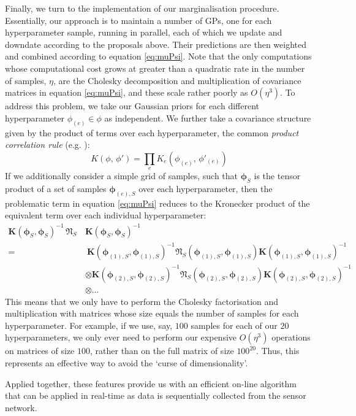 \documentclass{acmtrans2m}
\newcommand{\vect}[1]{\boldsymbol{#1}}
\newcommand{\vph}{\vect{\phi}}
\newcommand{\Nt}{\mat{\mathfrak{N}}_S}
\newcommand{\mat}[1]{\mathbf{#1}}
\begin{document}
Finally, we turn to the implementation of our marginalisation procedure. Essentially, our approach is to maintain a number of GPs, one for each hyperparameter sample, running in parallel, each of which we update and downdate according to the proposals above. Their predictions are then weighted and combined according to equation \eqref{eq:muPsi}. Note that the only computations whose computational cost grows at greater than a quadratic rate in the number of samples, $\eta$, are the Cholesky decomposition and multiplication of covariance matrices in equation \eqref{eq:muPsi}, and these scale rather poorly as $O(\eta^3)$. To address this problem, we take our Gaussian priors for each different hyperparameter $\phi_{(e)} \in \phi$ as independent. We further take a covariance structure given by the product of terms over each hyperparameter, the common \emph{product correlation rule} (e.g. ):
\begin{equation}
 K(\phi,\,\phi')=\prod_e K_e(\phi_{(e)},\,\phi'_{(e)})
\end{equation}
If we additionally consider a simple grid of samples, such that $\vph_{S}$ is the tensor product of a set of samples $\vph_{(e),S}$ over each hyperparameter, then the problematic term in equation \eqref{eq:muPsi} reduces to the Kronecker product of the equivalent term over each individual hyperparameter:
\begin{align}\label{eq:KNK}
\mat{K} \!(\vph_{S},\vph_S)^{-1}\,\Nt\,&\mat{K}\!(\vph_S,\vph_S)^{-1}\nonumber\\
 = & ~\mat{K}\!(\vph_{(1),S},\vph_{(1),S})^{-1}\Nt\!(\vph_{(1),S},\vph_{(1),S})\mat{K}\!(\vph_{(1),S},\vph_{(1),S})^{-1}\nonumber\\ & \otimes \mat{K}\!(\vph_{(2),S},\vph_{(2),S})^{-1}\Nt\!(\vph_{(2),S},\vph_{(2),S})\mat{K}\!(\vph_{(2),S},\vph_{(2),S})^{-1}\nonumber\\ & \otimes \ldots
\end{align}
This means that we only have to perform the Cholesky factorisation and multiplication with matrices whose size equals the number of samples for each hyperparameter. For example, if we use, say, $100$ samples for each of our $20$ hyperparameters, we only ever need to perform our expensive $O(\eta^3)$ operations on matrices of size $100$, rather than on the full matrix of size $100^{20}$. Thus, this represents an effective way to avoid the `curse of dimensionality'. 

Applied together, these features provide us with an efficient on-line algorithm that can be applied in real-time as data is sequentially collected from the sensor network.
\end{document}
